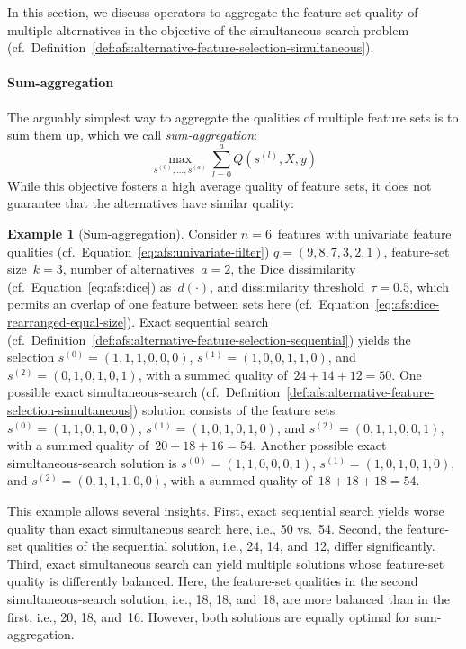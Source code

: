 \documentclass{article}
\theoremstyle{definition}
\newtheorem{example}{Example}
\begin{document}
In this section, we discuss operators to aggregate the feature-set quality of multiple alternatives in the objective of the simultaneous-search problem (cf.~Definition~\ref{def:afs:alternative-feature-selection-simultaneous}).

\paragraph{Sum-aggregation}

The arguably simplest way to aggregate the qualities of multiple feature sets is to sum them up, which we call \emph{sum-aggregation}:
%
\begin{equation}
	\max_{s^{(0)}, \dots, s^{(a)}} \sum_{l=0}^a Q(s^{(l)},X,y)
	\label{eq:afs:afs-simultaneous-sum-objective}
\end{equation}
%
While this objective fosters a high average quality of feature sets, it does not guarantee that the alternatives have similar quality:
%
\begin{example}[Sum-aggregation]
Consider $n=6$~features with univariate feature qualities (cf.~Equation~\ref{eq:afs:univariate-filter}) $q = (9,8,7,3,2,1)$, feature-set size~$k=3$, number of alternatives~$a=2$, the Dice dissimilarity (cf.~Equation~\ref{eq:afs:dice}) as~$d(\cdot)$, and dissimilarity threshold~$\tau = 0.5$, which permits an overlap of one feature between sets here (cf.~Equation~\ref{eq:afs:dice-rearranged-equal-size}).
Exact sequential search (cf.~Definition~\ref{def:afs:alternative-feature-selection-sequential}) yields the selection $s^{(0)} = (1,1,1,0,0,0)$, $s^{(1)} = (1,0,0,1,1,0)$, and $s^{(2)} = (0,1,0,1,0,1)$, with a summed quality of $\,24+14+12=50$.
One possible exact simultaneous-search (cf.~Definition~\ref{def:afs:alternative-feature-selection-simultaneous}) solution consists of the feature sets $s^{(0)} = (1,1,0,1,0,0)$, $s^{(1)} = (1,0,1,0,1,0)$, and $s^{(2)} = (0,1,1,0,0,1)$, with a summed quality of $\,20+18+16=54$.
Another possible exact simultaneous-search solution is $s^{(0)} = (1,1,0,0,0,1)$, $s^{(1)} = (1,0,1,0,1,0)$, and $s^{(2)} = (0,1,1,1,0,0)$, with a summed quality of $\,18+18+18=54$.
\label{ex:afs:sum-aggregation}
\end{example}
%
This example allows several insights.
First, exact sequential search yields worse quality than exact simultaneous search here, i.e., 50 vs.~54.
Second, the feature-set qualities of the sequential solution, i.e., 24, 14, and~12, differ significantly.
Third, exact simultaneous search can yield multiple solutions whose feature-set quality is differently balanced.
Here, the feature-set qualities in the second simultaneous-search solution, i.e., 18, 18, and~18, are more balanced than in the first, i.e., 20, 18, and~16.
However, both solutions are equally optimal for sum-aggregation.
\end{document}
